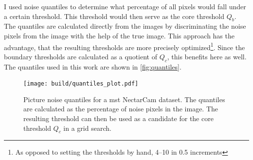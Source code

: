 I used noise quantiles to determine what percentage of all pixels would fall under a certain threshold. This threshold would
then serve as the core threshold \(Q_b\). The quantiles are calculated directly from the images by
discriminating the noise pixels from the image with the help of the true image. This approach has the
advantage, that the resulting thresholds are more precisely optimized\footnote{As opposed to setting the thresholds by hand, \eg{} \numrange{4}{10} in \num{0.5} increments}.
Since the boundary thresholds are calculated as a quotient of \(Q_c\), this benefits here as well.
The quantiles used in this work are shown in \autoref{fig:quantiles}.
\begin{figure}
    \centering
    \texttt{[image: build/quantiles\_plot.pdf]}
    \caption{Picture noise quantiles for a \gls{mst} NectarCam dataset. The quantiles are calculated
    as the percentage of noise pixels in the image. The resulting threshold can then be used as a
    candidate for the core threshold \(Q_c\) in a grid search.}
    \label{fig:quantiles}
    \vspace{-0.5cm}
\end{figure}

